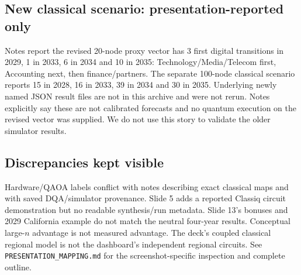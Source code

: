 \documentclass[11pt,letterpaper]{article}
\newcommand{\page}{\clearpage}
\newcommand{\file}[1]{\nolinkurl{#1}}
\begin{document}
\subsection{New classical scenario: presentation-reported only}
Notes report the revised 20-node proxy vector has 3 first digital transitions in 2029, 1 in 2033, 6 in 2034 and 10 in 2035: Technology/Media/Telecom first, Accounting next, then finance/partners. The separate 100-node classical scenario reports 15 in 2028, 16 in 2033, 39 in 2034 and 30 in 2035. Underlying newly named JSON result files are not in this archive and were not rerun. Notes explicitly say these are not calibrated forecasts and no quantum execution on the revised vector was supplied. We do not use this story to validate the older simulator results.

\subsection{Discrepancies kept visible}
Hardware/QAOA labels conflict with notes describing exact classical maps and with saved DQA/simulator provenance. Slide 5 adds a reported Classiq circuit demonstration but no readable synthesis/run metadata. Slide 13's bonuses and 2029 California example do not match the neutral four-year results. Conceptual large-$n$ advantage is not measured advantage. The deck's coupled classical regional model is not the dashboard's independent regional circuits. See \file{PRESENTATION_MAPPING.md} for the screenshot-specific inspection and complete outline.
\page


\end{document}
